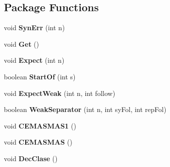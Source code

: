 \subsection*{Package Functions}
\begin{DoxyCompactItemize}
\item 
\hypertarget{classcompilationunit_1_1_parser_a96b6d7c76de857255401bc65b3003a1a}{
void {\bfseries SynErr} (int n)}
\label{classcompilationunit_1_1_parser_a96b6d7c76de857255401bc65b3003a1a}

\item 
\hypertarget{classcompilationunit_1_1_parser_a238f96de3bbefccd05db9154c3d23249}{
void {\bfseries Get} ()}
\label{classcompilationunit_1_1_parser_a238f96de3bbefccd05db9154c3d23249}

\item 
\hypertarget{classcompilationunit_1_1_parser_a0f103513699aafeddf6c9061d2dfba08}{
void {\bfseries Expect} (int n)}
\label{classcompilationunit_1_1_parser_a0f103513699aafeddf6c9061d2dfba08}

\item 
\hypertarget{classcompilationunit_1_1_parser_a6e2c1834e323694b0bad3e3d8e81e461}{
boolean {\bfseries StartOf} (int s)}
\label{classcompilationunit_1_1_parser_a6e2c1834e323694b0bad3e3d8e81e461}

\item 
\hypertarget{classcompilationunit_1_1_parser_a499e1cb617ee8ce98e1031459d2c217d}{
void {\bfseries ExpectWeak} (int n, int follow)}
\label{classcompilationunit_1_1_parser_a499e1cb617ee8ce98e1031459d2c217d}

\item 
\hypertarget{classcompilationunit_1_1_parser_a390db6c64f954042b3cb57c4a31c27f4}{
boolean {\bfseries WeakSeparator} (int n, int syFol, int repFol)}
\label{classcompilationunit_1_1_parser_a390db6c64f954042b3cb57c4a31c27f4}

\item 
\hypertarget{classcompilationunit_1_1_parser_a7f64775b47d08fa9c943aa8b8a27bcc8}{
void {\bfseries CEMASMAS1} ()}
\label{classcompilationunit_1_1_parser_a7f64775b47d08fa9c943aa8b8a27bcc8}

\item 
\hypertarget{classcompilationunit_1_1_parser_a6d899875edb079881bf62ccc61956338}{
void {\bfseries CEMASMAS} ()}
\label{classcompilationunit_1_1_parser_a6d899875edb079881bf62ccc61956338}

\item 
\hypertarget{classcompilationunit_1_1_parser_a292f8b52abbf014362cd08a356fc8c8b}{
void {\bfseries DecClase} ()}
\label{classcompilationunit_1_1_parser_a292f8b52abbf014362cd08a356fc8c8b}


\end{DoxyCompactItemize}
